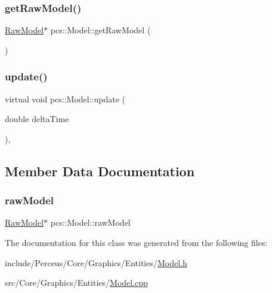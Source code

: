 \subsubsection{\texorpdfstring{get\+Raw\+Model()}{getRawModel()}}
{\footnotesize\ttfamily \hyperlink{classpcs_1_1RawModel}{Raw\+Model}$\ast$ pcs\+::\+Model\+::get\+Raw\+Model (\begin{DoxyParamCaption}{ }\end{DoxyParamCaption})\hspace{0.3cm}{\ttfamily [inline]}}

\mbox{\label{classpcs_1_1Model_a143831f415158255b910e25ac542de19}} 
\subsubsection{\texorpdfstring{update()}{update()}}
{\footnotesize\ttfamily virtual void pcs\+::\+Model\+::update (\begin{DoxyParamCaption}\item[{double}]{delta\+Time }\end{DoxyParamCaption})\hspace{0.3cm}{\ttfamily [inline]}, {\ttfamily [virtual]}}



\subsection{Member Data Documentation}
\mbox{\label{classpcs_1_1Model_a40bca7561aa0a79a5d0d386d1b875bfe}} 
\subsubsection{\texorpdfstring{raw\+Model}{rawModel}}
{\footnotesize\ttfamily \hyperlink{classpcs_1_1RawModel}{Raw\+Model}$\ast$ pcs\+::\+Model\+::raw\+Model\hspace{0.3cm}{\ttfamily [private]}}



The documentation for this class was generated from the following files\+:\begin{DoxyCompactItemize}
\item 
include/\+Perceus/\+Core/\+Graphics/\+Entities/\hyperlink{Model_8h}{Model.\+h}\item 
src/\+Core/\+Graphics/\+Entities/\hyperlink{Model_8cpp}{Model.\+cpp}\end{DoxyCompactItemize}
